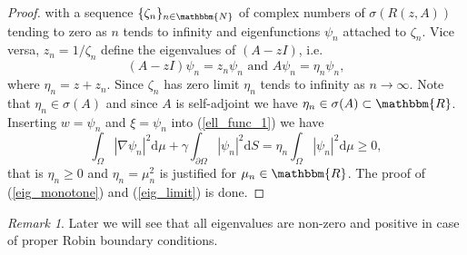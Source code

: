 \documentclass[a4paper,11pt]{article}
\theoremstyle{plain} %
\theoremstyle{definition} %
\theoremstyle{remark} %
\newtheorem{remark}{Remark}[section]
\theoremstyle{remark}
\begin{document}
\begin{proof}
with a sequence $ \{ \zeta_n \}_{n \in \mathbbm{N}} $ of complex numbers of $\sigma (R(z,A )) $ tending to zero as $n$ tends to infinity and eigenfunctions $\psi_n $ attached to $ \zeta_n $. Vice versa, $ z_n = 1 / \zeta_n $ define the eigenvalues of $(A - zI) $, i.e.
\begin{equation*}
(A - zI) \psi_n = z_n \psi_n \text{ and } A \psi_n = \eta_n \psi_n ,
\end{equation*}
where $ \eta_n = z + z_n $. Since $ \zeta_n $ has zero limit $ \eta_n $ tends to infinity as $n \rightarrow \infty $. Note that $ \eta_n \in \sigma (A) $ and since $A$ is self-adjoint we have $ \eta_n \in \sigma (A) \subset \mathbbm{R}$. Inserting $ w = \psi_n $ and $ \xi = \psi_n $ into (\ref{ell_func_1}) we have
\begin{equation*}
\int_\Omega \left| \nabla \psi_n \right|^2  \mathrm{d}\mu + \gamma \int_{\partial \Omega } \left| \psi_n \right|^2 \mathrm{d} S = \eta_n \int_\Omega \left| \psi_n \right|^2 \mathrm{d} \mu \geq 0,
\end{equation*}
that is $ \eta_n \geq 0 $ and $ \eta_n = \mu^2_n $ is justified for $ \mu_n \in \mathbbm{R} $. The proof of (\ref{eig_monotone}) and (\ref{eig_limit}) is done.
\end{proof}
%
\begin{remark}
Later we will see that all eigenvalues are non-zero and positive in case of proper Robin boundary conditions.
\end{remark}
%
\end{document}
